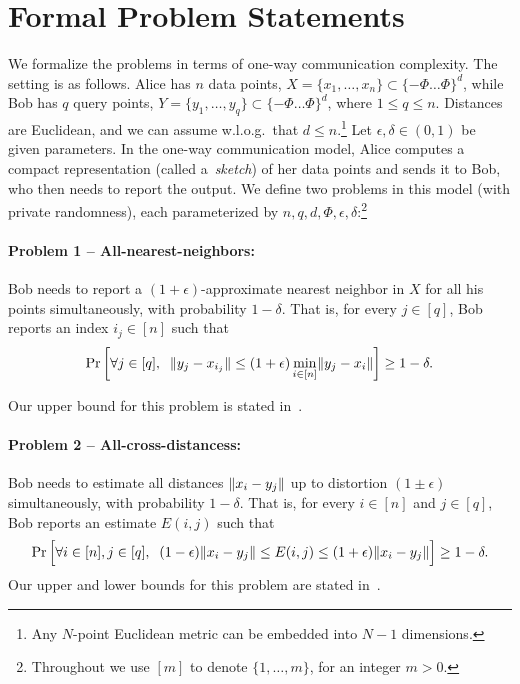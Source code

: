 \section{Formal Problem Statements}
\label{s:formal}
We formalize the problems in terms of one-way communication complexity.
The setting is as follows.
Alice has $n$ data points, $X=\{x_1,\ldots,x_n\} \subset \{-\Phi \ldots \Phi\}^d$, while
Bob has $q$ query points, $Y=\{y_1,\ldots,y_q\}  \subset \{-\Phi \ldots \Phi\}^d$, where $1\leq q\leq n$.
Distances are Euclidean, and we can assume w.l.o.g.~that $d\leq n$.\footnote{Any $N$-point Euclidean metric can be embedded into $N-1$ dimensions.}
Let $\epsilon,\delta\in(0,1)$ be given parameters.
In the one-way communication model, Alice computes a compact representation (called a~\emph{sketch}) of her data points and sends it to Bob, who then needs to report the output.
We define two problems in this model (with private randomness), each parameterized by $n,q,d,\Phi,\epsilon,\delta$:\footnote{Throughout we use $[m]$ to denote $\{1,\ldots,m\}$, for an integer $m>0$.}

\paragraph{Problem 1 -- All-nearest-neighbors:}
Bob needs to report a $(1+\epsilon)$-approximate nearest neighbor in $X$ for all his points simultaneously, with probability $1-\delta$.
That is, for every $j\in[q]$, Bob reports an index $i_j\in[n]$ such that 
\[ \Pr\left[ \forall j\in[q], \;\; \lVert y_j-x_{i_j}\rVert\leq(1+\epsilon)\min_{i\in[n]}\lVert y_j-x_i\rVert \right] \geq 1-\delta . \]

Our upper bound for this problem is stated in~.

\paragraph{Problem 2 -- All-cross-distancess:}
Bob needs to estimate all distances $\lVert x_i-y_j\rVert$ up to distortion $(1\pm\epsilon)$ simultaneously, with probability $1-\delta$.
That is, for every $i\in[n]$ and $j\in[q]$, Bob reports an estimate $E(i,j)$ such that
\[ \Pr\Big[ \forall i\in[n],j\in[q], \;\; (1-\epsilon)\lVert x_i-y_j\rVert \leq E(i,j) \leq (1+\epsilon)\lVert x_i-y_j\rVert \Big] \geq 1-\delta . \]
Our upper and lower bounds for this problem are stated in~.

